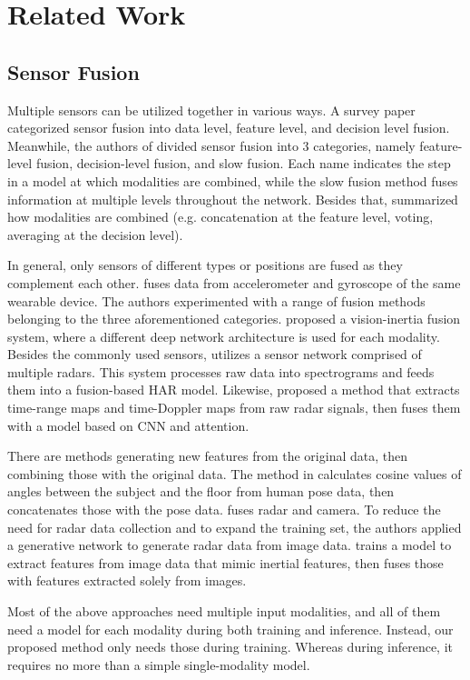 \documentclass[conference]{IEEEtran}
\begin{document}
\section{Related Work}
\subsection{Sensor Fusion}
Multiple sensors can be utilized together in various ways. A survey paper \cite{Aguileta2019} categorized sensor fusion into data level, feature level, and decision level fusion. Meanwhile, the authors of \cite{Yadav2021} divided sensor fusion into 3 categories, namely feature-level fusion, decision-level fusion, and slow fusion. Each name indicates the step in a model at which modalities are combined, while the slow fusion method fuses information at multiple levels throughout the network. Besides that, \cite{Aguileta2019} summarized how modalities are combined (e.g. concatenation at the feature level, voting, averaging at the decision level).

In general, only sensors of different types or positions are fused as they complement each other. \cite{Webber2021} fuses data from accelerometer and gyroscope of the same wearable device. The authors experimented with a range of fusion methods belonging to the three aforementioned categories. \cite{Islam2023} proposed a vision-inertia fusion system, where a different deep network architecture is used for each modality. Besides the commonly used sensors, \cite{Zhu2022} utilizes a sensor network comprised of multiple radars. This system processes raw data into spectrograms and feeds them into a fusion-based HAR model. Likewise, \cite{Cao2023} proposed a method that extracts time-range maps and time-Doppler maps from raw radar signals, then fuses them with a model based on CNN and attention.

There are methods generating new features from the original data, then combining those with the original data. The method in \cite{Pham2021} calculates cosine values of angles between the subject and the floor from human pose data, then concatenates those with the pose data. \cite{Feng2023} fuses radar and camera. To reduce the need for radar data collection and to expand the training set, the authors applied a generative network to generate radar data from image data. \cite{Vu2023} trains a model to extract features from image data that mimic inertial features, then fuses those with features extracted solely from images.

Most of the above approaches need multiple input modalities, and all of them need a model for each modality during both training and inference. Instead, our proposed method only needs those during training. Whereas during inference, it requires no more than a simple single-modality model.
\end{document}
